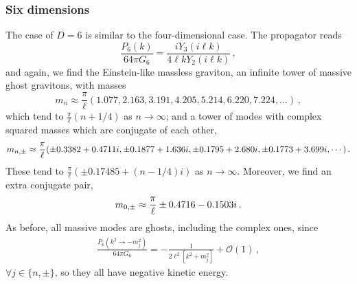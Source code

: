 \documentclass[11pt]{article}
\begin{document}
{\subsubsection{Six dimensions}
The case of $D=6$ is similar to the four-dimensional case. The propagator reads
\begin{equation}
\frac{P_{6}(k)}{64 \pi G_6}= \frac{i Y_{3}(i \ell k)}{4 \ell k Y_{2}(i \ell k)}\,,
\end{equation}
  and again, we find the Einstein-like massless graviton, an infinite tower of massive ghost gravitons, with masses
 \begin{equation}
 m_n\approx \frac{\pi}{\ell} (1.077, 2.163, 3.191, 4.205, 5.214, 6.220, 7.224,\dots)\,,
 \end{equation}
which tend to $\frac{\pi}{\ell} \left( n + 1/4 \right)$ as $n \rightarrow \infty$; and a tower of modes with complex squared masses which are conjugate of each other,
 \begin{equation}
 m_{n, \rm \pm} \approx \frac{\pi}{\ell} (\pm 0.3382 + 0.4711 i, \pm 0.1877 + 1.636 i, \pm 0.1795 + 2.680 i, \pm 0.1773 + 
 3.699 i, \cdots) \,.
 \end{equation}
These tend to $\frac{\pi}{\ell} (\pm 0.17485 + (n-1/4) i)$ as $n \rightarrow \infty$. Moreover, we find an extra conjugate pair,
 \begin{equation}
 m_{0, \rm \pm} \approx \frac{\pi}{\ell} \pm 0.4716 - 0.1503 i \,.
 \end{equation}
As before, all massive modes are ghosts, including the complex ones, since 
 \begin{align}
\frac{P_{6}(k^2\rightarrow -m_j^2  )}{64\pi G_6}=-\frac{1}{2 \ell^2 [k^2+m_j^2]}+\mathcal{O}(1) \,,
\end{align}
$\forall j \in \{n, \pm \}$, so they all have negative kinetic energy.


}
\end{document}
